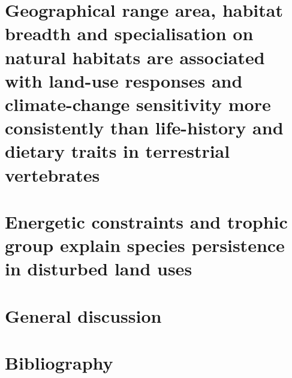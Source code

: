 \documentclass[11pt]{report}
\renewcommand{\baselinestretch}{1.5}
\begin{document}
\begin{refsection}
\chapter{Geographical range area, habitat breadth and specialisation on natural habitats are associated with land-use responses and climate-change sensitivity more consistently than life-history and dietary traits in terrestrial vertebrates}
\label{sec:4}


\chapter{Energetic constraints and trophic group explain species persistence in disturbed land uses}
\label{sec:5}


\chapter{General discussion}
\label{sec:6}





\clearpage
{}
\chapter*{Bibliography}
\renewcommand{\baselinestretch}{1}
\printbibliography[heading=none]

\end{refsection}
\end{document}
